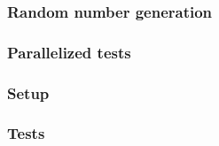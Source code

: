 \subsubsection*{Random number generation}


\subsubsection*{Parallelized tests}

\subsubsection*{Setup}
\subsubsection*{Tests}
